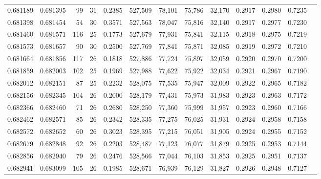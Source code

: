 \begin{tabular}{rrrrrrrrrrrrr}
0.681189 & 0.681395 &    99 &  31 &                                     0.2385 & 527,509 &  78,101 &  75,786 &  32,170 & 0.2917 & 0.2980 & 0.7235 \\
0.681398 & 0.681454 &    54 &  30 &                                     0.3571 & 527,563 &  78,047 &  75,816 &  32,140 & 0.2917 & 0.2977 & 0.7230 \\
0.681460 & 0.681571 &   116 &  25 &                                     0.1773 & 527,679 &  77,931 &  75,841 &  32,115 & 0.2918 & 0.2975 & 0.7219 \\
0.681573 & 0.681657 &    90 &  30 &                                     0.2500 & 527,769 &  77,841 &  75,871 &  32,085 & 0.2919 & 0.2972 & 0.7210 \\
0.681664 & 0.681856 &   117 &  26 &                                     0.1818 & 527,886 &  77,724 &  75,897 &  32,059 & 0.2920 & 0.2970 & 0.7200 \\
0.681859 & 0.682003 &   102 &  25 &                                     0.1969 & 527,988 &  77,622 &  75,922 &  32,034 & 0.2921 & 0.2967 & 0.7190 \\
0.682012 & 0.682151 &    87 &  25 &                                     0.2232 & 528,075 &  77,535 &  75,947 &  32,009 & 0.2922 & 0.2965 & 0.7182 \\
0.682156 & 0.682345 &   104 &  26 &                                     0.2000 & 528,179 &  77,431 &  75,973 &  31,983 & 0.2923 & 0.2963 & 0.7172 \\
0.682366 & 0.682460 &    71 &  26 &                                     0.2680 & 528,250 &  77,360 &  75,999 &  31,957 & 0.2923 & 0.2960 & 0.7166 \\
0.682462 & 0.682571 &    85 &  26 &                                     0.2342 & 528,335 &  77,275 &  76,025 &  31,931 & 0.2924 & 0.2958 & 0.7158 \\
0.682572 & 0.682652 &    60 &  26 &                                     0.3023 & 528,395 &  77,215 &  76,051 &  31,905 & 0.2924 & 0.2955 & 0.7152 \\
0.682679 & 0.682848 &    92 &  26 &                                     0.2203 & 528,487 &  77,123 &  76,077 &  31,879 & 0.2925 & 0.2953 & 0.7144 \\
0.682856 & 0.682940 &    79 &  26 &                                     0.2476 & 528,566 &  77,044 &  76,103 &  31,853 & 0.2925 & 0.2951 & 0.7137 \\
0.682941 & 0.683099 &   105 &  26 &                                     0.1985 & 528,671 &  76,939 &  76,129 &  31,827 & 0.2926 & 0.2948 & 0.7127 \\

\end{tabular}
